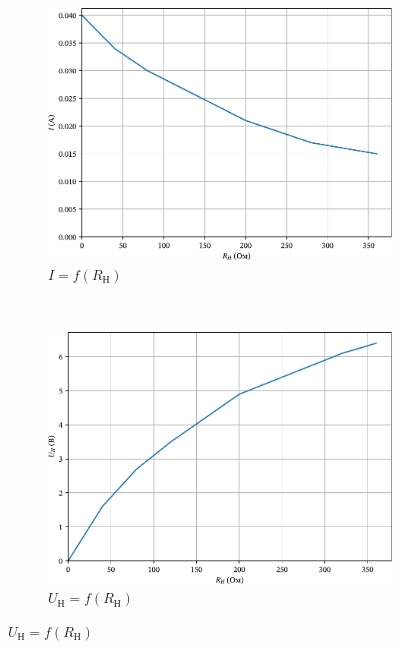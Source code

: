 \documentclass[a4paper,oneside,DIV=10,12pt]{scrartcl}
\begin{document}
		\begin{figure}
		\centering
			\begin{subfigure}[b]{0.49\textwidth}
				\includegraphics[width=\textwidth]{01-i-edited.pdf}
				\caption{$I = f(R_{\text{Н}})$}
			\end{subfigure}
			~
			\begin{subfigure}[b]{0.49\textwidth}
				\includegraphics[width=\textwidth]{02-u-nag-edited.pdf}
				\caption{$U_{\text{Н}} = f(R_{\text{Н}})$}
			\end{subfigure}
			
			\vspace*{\floatsep}
			

\end{figure}
\end{document}
